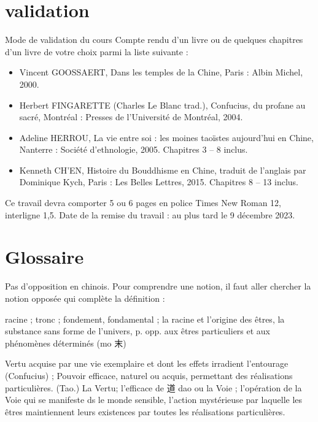 \section{validation}
Mode de validation du cours   Compte rendu d’un livre ou de quelques chapitres d’un livre de votre choix parmi la liste suivante :  
\begin{itemize}

\item  Vincent GOOSSAERT, Dans les temples de la Chine, Paris : Albin Michel, 2000.  
\item  Herbert FINGARETTE (Charles Le Blanc trad.), Confucius, du profane au sacré, Montréal : Presses de l’Université de Montréal, 2004.  
\item  Adeline HERROU, La vie entre soi : les moines taoïstes aujourd’hui en Chine, Nanterre : Société d’ethnologie, 2005. Chapitres 3 – 8 inclus.  
\item  Kenneth CH’EN, Histoire du Bouddhisme en Chine, traduit de l’anglais par Dominique Kych, Paris : Les Belles Lettres, 2015. Chapitres 8 – 13 inclus.   

\end{itemize}

Ce travail devra comporter 5 ou 6 pages en police Times New Roman 12, interligne 1,5.   Date de la remise du travail : au plus tard le 9 décembre 2023. 




\section{Glossaire}


Pas d'opposition en chinois. Pour comprendre une notion, il faut aller chercher la notion opposée qui complète la définition : \label{DefGlossaire}


\begin{Def}[ben 本]
    racine ; tronc ; fondement, fondamental ; la racine et l’origine des êtres, la substance sans forme de l’univers, p. opp. aux êtres particuliers et aux phénomènes déterminés (mo 末) 
\end{Def}



\begin{Def}[de 德]
    Vertu acquise par une vie exemplaire et dont les effets irradient l’entourage (Confucius) ; Pouvoir efficace, naturel ou acquis, permettant des réalisations particulières.     (Tao.) La Vertu; l’efficace de 道 dao ou la Voie ; l’opération de la Voie qui se manifeste ds le monde sensible, l’action mystérieuse par laquelle les êtres maintiennent leurs existences par toutes les réalisations particulières.
\end{Def}

